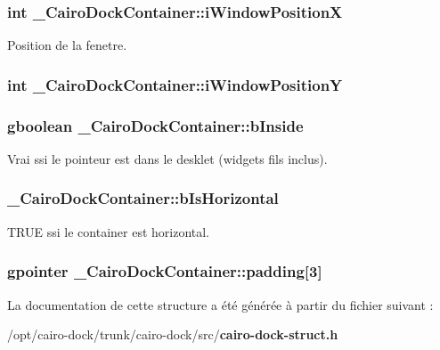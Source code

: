 \subsubsection{\setlength{\rightskip}{0pt plus 5cm}int {\bf \_\-CairoDockContainer::iWindowPositionX}}\label{struct__CairoDockContainer_a8dbd68166e07c040b83ba4e5a89e010}


Position de la fenetre. 

\subsubsection{\setlength{\rightskip}{0pt plus 5cm}int {\bf \_\-CairoDockContainer::iWindowPositionY}}\label{struct__CairoDockContainer_6181f8875edbc179967d430eaadadfe7}


\subsubsection{\setlength{\rightskip}{0pt plus 5cm}gboolean {\bf \_\-CairoDockContainer::bInside}}\label{struct__CairoDockContainer_39e049641fd80eea229a5cc9a26e537b}


Vrai ssi le pointeur est dans le desklet (widgets fils inclus). 

\subsubsection{ {\bf \_\-CairoDockContainer::bIsHorizontal}}\label{struct__CairoDockContainer_f8e6004647c2c8ce8c9aac86016b8cbe}


TRUE ssi le container est horizontal. 

\subsubsection{\setlength{\rightskip}{0pt plus 5cm}gpointer {\bf \_\-CairoDockContainer::padding}[3]}\label{struct__CairoDockContainer_a523c9fd94919426a9a458df58f068c1}




La documentation de cette structure a été générée à partir du fichier suivant :\begin{CompactItemize}
\item 
/opt/cairo-dock/trunk/cairo-dock/src/{\bf cairo-dock-struct.h}\end{CompactItemize}
